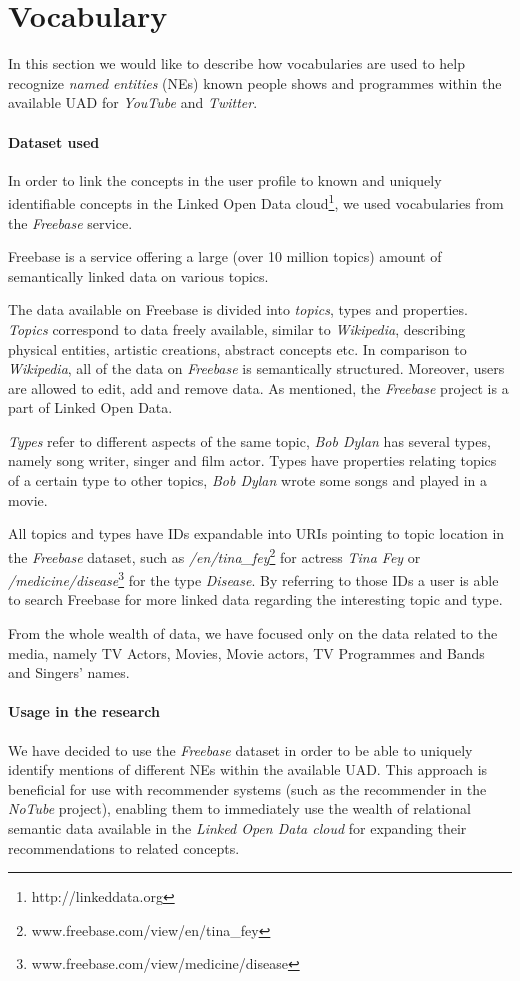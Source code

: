 \section{Vocabulary}
\label{sec:vocabulary}
In this section we would like to describe how vocabularies are used to help recognize \textit{named entities} (NEs)
known people shows and programmes within the available UAD for \textit{YouTube} and \textit{Twitter}.

\paragraph{Dataset used}
In order to link the concepts in the user profile to known and uniquely identifiable concepts in the Linked Open Data
cloud\footnote{http://linkeddata.org}, we used vocabularies from the \textit{Freebase} service.

Freebase is a service offering a large (over 10 million topics) amount of semantically linked data on various topics.

The data available on Freebase is divided into \textit{topics}, types and properties. \textit{Topics} correspond to data
freely available, similar to \textit{Wikipedia}, describing physical entities, artistic creations, abstract concepts
etc. In comparison to \textit{Wikipedia}, all of the data on \textit{Freebase} is semantically structured. Moreover,
users are allowed to edit, add and remove data. As mentioned, the \textit{Freebase} project is a part of Linked Open Data.

\textit{Types} refer to different aspects of the same topic, \eg \textit{Bob Dylan} has several types, namely
song writer, singer and film actor. Types have properties relating topics of a certain type to other topics, \eg
\textit{Bob Dylan} wrote some songs and played in a movie.

All topics and types have IDs expandable into URIs pointing to topic location in the \textit{Freebase} dataset,
such as \textit{/en/tina\_fey}\footnote{www.freebase.com/view/en/tina\_fey} for actress \textit{Tina Fey}
or \textit{/medicine/disease}\footnote{www.freebase.com/view/medicine/disease} for the type \textit{Disease}.
By referring to those IDs a user is able to search Freebase for more linked data regarding the interesting topic and type.

From the whole wealth of data, we have focused only on the data related to the media, namely TV Actors, Movies, Movie
actors, TV Programmes and Bands and Singers' names.

\paragraph{Usage in the research}
We have decided to use the \textit{Freebase} dataset in order to be able to uniquely identify mentions of different NEs
within the available UAD. This approach is beneficial for use with recommender systems (such as the recommender
in the \textit{NoTube} project), enabling them to immediately use the wealth of relational semantic data available
in the \textit{Linked Open Data cloud} for expanding their recommendations to related concepts.
